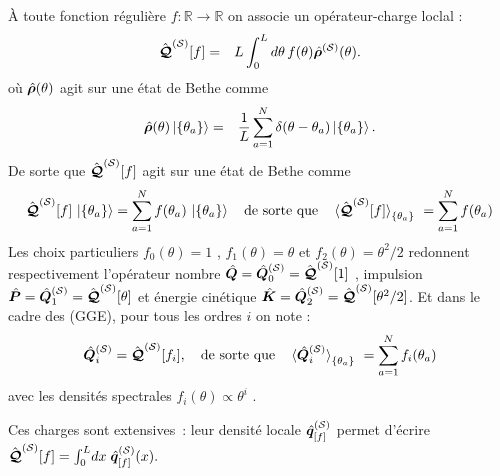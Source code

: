 
À toute fonction régulière
\(
  f:\mathbb R\!\to\!\mathbb R
\)
on associe un opérateur-charge loclal :
\begin{eqnarray}\label{chap.2.charge.f.1}
	\hat{\bm{\mathcal{Q}}}^{(\mathcal{S})}[f] & = &  L \int_0^L d\theta \, f(\theta) \hat{\bm{\rho}}^{(\mathcal{S})}(\theta).	
\end{eqnarray}
où $\hat{\bm{\rho}}(\theta)$ agit sur une état de Bethe comme 
\begin{eqnarray}\label{chap.2.rho.1}
	 \hat{\bm{\rho}}(\theta) \ket{ \{ \theta_a \} } &=& \frac{1}{L} \sum_{a = 1 }^N  \delta ( \theta - \theta_a ) \ket{ \{ \theta_a \} }.	
\end{eqnarray}
De sorte que $\hat{\bm{\mathcal{Q}}}^{(\mathcal{S})}[f]$ agit sur une état de Bethe comme
\begin{eqnarray}\label{chap.2.charge.1}
	\operator{\mathcal{Q}}^{(\mathcal{S})}[f]\,\ket{\{\theta_a\} } =  \sum_{a=1}^{N}f(\theta_a)\,\ket{\{\theta_a\} } \quad \mbox{de sorte que} \quad \braket{\operator{\mathcal{Q}}^{(\mathcal{S})}[f]}_{\{\theta_a\}} = \sum_{a=1}^N f(\theta_a)
\end{eqnarray}
Les choix particuliers
\(
  f_0(\theta)=1
\)
,
\(
  f_1(\theta)=\theta
\)
et
\(
  f_2(\theta)=\theta^{2}/2
\)
redonnent respectivement l'opérateur nombre \(\hat{\bm{Q}}=\hat{\bm{Q}}_0^{(\mathcal{S})} = \hat{\bm{\mathcal{Q}}}^{(\mathcal{S})}[1]\) , impulsion \(\hat{\bm{P}}=\hat{\bm{Q}}_1^{(\mathcal{S})} = \hat{\bm{\mathcal{Q}}}^{(\mathcal{S})}[\theta]\) et énergie cinétique
\(\hat{\bm{K}}=\hat{\bm{Q}}_2^{(\mathcal{S})} = \hat{\bm{\mathcal{Q}}}^{(\mathcal{S})}[\theta^2/2]\). Et dans le cadre des (GGE), pour tous les ordres $i$ on note :
\begin{eqnarray}\label{chap.2.charge.ordre.i.1}
	\operator{Q}^{(\mathcal{S})}_i = \operator{\mathcal{Q}}^{(\mathcal{S})}[f_i]	, \quad \mbox{de sorte que} \quad \braket{\operator{Q}^{(\mathcal{S})}_i}_{\{\theta_a\}} = \sum_{a=1}^N f_i(\theta_a)  
\end{eqnarray}
avec les densités spectrales $f_i(\theta) \propto \theta^i$ . 

Ces charges sont extensives : leur densité locale $\hat{\bm{q}}^{(\mathcal{S})}_{[f]}$ permet d’écrire
\(
  \hat{\bm{\mathcal{Q}}}^{(\mathcal{S})}[f]=\int_0^{L}\!dx\;\hat{\bm{q}}^{(\mathcal{S})}_{[f]}(x).
\)

